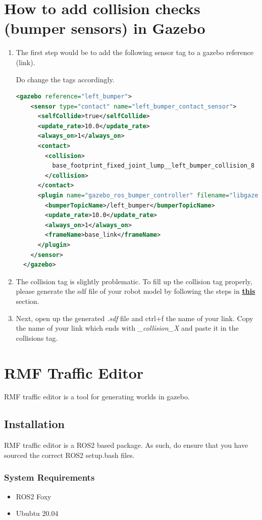 \documentclass[11pt]{article}
\begin{document}
\section{How to add collision checks (bumper sensors) in Gazebo}
\begin{enumerate}
 \item {
       The first step would be to add the following sensor tag to a gazebo reference (link).
       
       Do change the tags accordingly.
       \begin{lstlisting}[language=xml]
  <gazebo reference="left_bumper">
    <sensor type="contact" name="left_bumper_contact_sensor">
      <selfCollide>true</selfCollide>
      <update_rate>10.0</update_rate>
      <always_on>1</always_on>
      <contact>
        <collision>
          base_footprint_fixed_joint_lump__left_bumper_collision_8
        </collision>
      </contact>
      <plugin name="gazebo_ros_bumper_controller" filename="libgazebo_ros_bumper.so">
        <bumperTopicName>/left_bumper</bumperTopicName>
        <update_rate>10.0</update_rate>
        <always_on>1</always_on>
        <frameName>base_link</frameName>
      </plugin>
    </sensor>
  </gazebo>
\end{lstlisting}
       }
 \item {
       The collision tag is slightly problematic. To fill up the collision tag properly, please generate the
       sdf file of your robot model by following the steps in \hyperref[sec:conversion]{\textbf{this}} section.
       }
 \item {
       Next, open up the generated \emph{.sdf} file and ctrl+f the name of your link. Copy the name of your link which ends with \emph{\_collision\_X} and paste it in the collisions tag.
       
       }
\end{enumerate}
\section{RMF Traffic Editor}
RMF traffic editor is a tool for generating worlds in gazebo.
\subsection{Installation}
RMF traffic editor is a ROS2 based package. As such, do ensure that you have sourced the correct ROS2 setup.bash files.
\subsubsection{System Requirements}
\begin{itemize}
 \item {ROS2 Foxy}
 \item {Ububtu 20.04}
\end{itemize}
\end{document}
